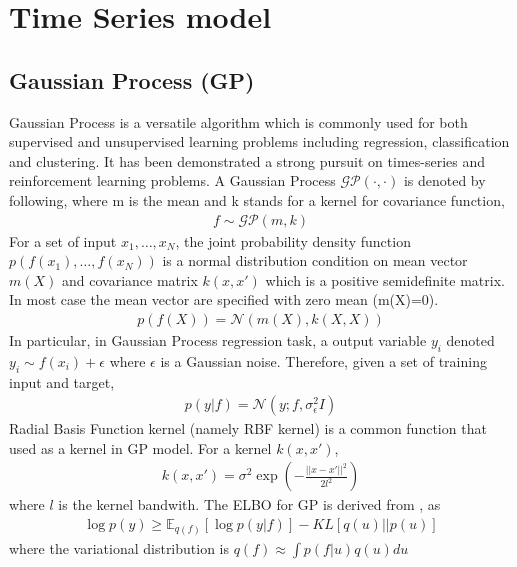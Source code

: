 \section{Time Series model}
\subsection{Gaussian Process (GP)}
Gaussian Process\cite{rasmussen_gaussian_2005} is a versatile algorithm which is commonly used for both supervised and unsupervised learning problems including regression, classification and clustering. It has been demonstrated a strong pursuit on times-series and reinforcement learning problems. A Gaussian Process $ \mathcal{GP}(\cdot,\cdot) $ is denoted by following, where m is the mean and k stands for a kernel for covariance function,
\begin{align*}
f\sim\mathcal{GP}(m,k)
\end{align*}
For a set of input $ x_1,\dots,x_N $, the joint probability density function $ p(f(x_1),\dots,f(x_N)) $ is a normal distribution condition on mean vector $ m(X) $ and covariance matrix $ k(x,x') $ which is a positive semidefinite matrix. In most case the mean vector are specified with zero mean (m(X)=0).
\begin{align*}
p(f(X))=\mathcal{N}(m(X),k(X,X))
\end{align*}
In particular, in Gaussian Process regression task, a output variable $ y_i $ denoted $ y_i\sim f(x_i)+\epsilon $ where $ \epsilon $ is a Gaussian noise. Therefore, given a set of training input and target, 
\begin{align*}
p(y|f)=\mathcal{N}(y;f,\sigma_\epsilon^2I)
\end{align*} 
Radial Basis Function kernel (namely RBF kernel) is a common function that used as a kernel in GP model. For a kernel $ k(x,x') $,
\begin{align*}
k(x,x')=\sigma^2\exp\left(-\frac{||x-x'||^2}{2l^2}\right)
\end{align*}
where $ l $ is the kernel bandwith.
The ELBO for GP is derived from \cite{hensman_gaussian_nodate}, as
\begin{align*}
\log p(y)\geq\mathbb{E}_{q(f)}[\log p(y|f)]-KL[q(u)||p(u)]
\end{align*}
where the variational distribution is $ q(f)\approx\int p(f|u)q(u)du $
